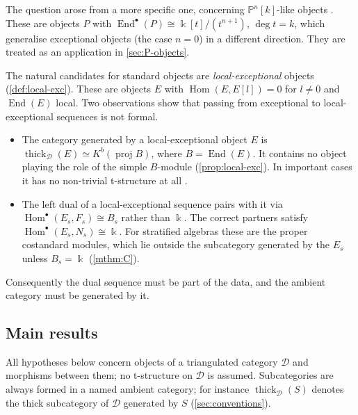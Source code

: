 \documentclass[11pt,reqno]{amsart}
\theoremstyle{plain}
\theoremstyle{definition}
\theoremstyle{remark}
\newcommand{\kk}{\Bbbk}
\DeclareMathOperator{\Hom}{Hom}
\DeclareMathOperator{\End}{End}
\newcommand{\proj}{\operatorname{proj}}
\newcommand{\Kb}{K^b}
\newcommand{\thick}[2][\cD]{\operatorname{thick}_{#1}(#2)}
\newcommand{\Pn}[2]{\mathbb{P}^{#1}[#2]}
\newcommand{\cD}{\mathcal{D}}
\begin{document}
The question arose from a more specific one, concerning $\Pn nk$-like objects \cite{HT06,Kru18,HK19}. These are objects $P$ with $\End^\bullet(P)\cong\kk[t]/(t^{n+1})$, $\deg t=k$, which generalise exceptional objects (the case $n=0$) in a different direction. They are treated as an application in \cref{sec:P-objects}.

The natural candidates for standard objects are \emph{local-exceptional} objects (\cref{def:local-exc}). These are objects $E$ with $\Hom(E,E[l])=0$ for $l\ne0$ and $\End(E)$ local. Two observations show that passing from exceptional to local-exceptional sequences is not formal.
\begin{itemize}
\item The category generated by a local-exceptional object $E$ is $\thick{E}\simeq\Kb(\proj B)$, where $B=\End(E)$. It contains no object playing the role of the simple $B$-module (\cref{prop:local-exc}). In important cases it has no non-trivial t-structure at all \cite{HJY13,Bonf26}.
\item The left dual of a local-exceptional sequence pairs with it via $\Hom^\bullet(E_s,F_s)\cong B_s$ rather than $\kk$. The correct partners satisfy $\Hom^\bullet(E_s,N_s)\cong\kk$. For stratified algebras these are the proper costandard modules, which lie outside the subcategory generated by the $E_s$ unless $B_s=\kk$ (\cref{mthm:C}).
\end{itemize}
Consequently the dual sequence must be part of the data, and the ambient category must be generated by it.

\subsection{Main results}
All hypotheses below concern objects of a triangulated category $\cD$ and morphisms between them; no t-structure on $\cD$ is assumed. Subcategories are always formed in a named ambient category; for instance $\thick{S}$ denotes the thick subcategory of $\cD$ generated by $S$ (\cref{sec:conventions}).
\end{document}
